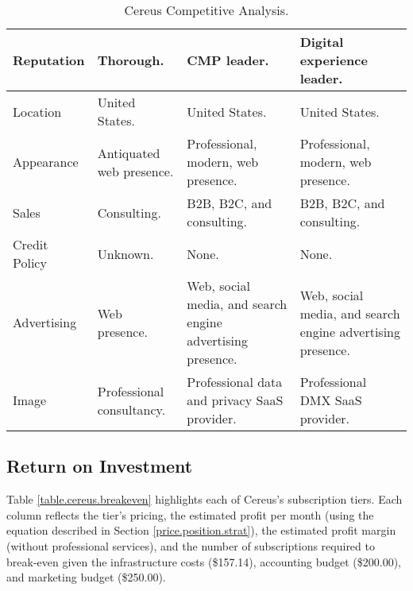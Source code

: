 \begin{sidewaystable}
\begin{tabularx}{\textwidth}{p{2.5cm} | p{6.5cm} | p{6.5cm} | p{6.5cm}}
    Reputation & Thorough. & CMP leader. & Digital experience leader. \\

    \hline

    Location & United States. & United States. & United States. \\

    \hline

    Appearance & Antiquated web presence. & Professional, modern, web presence. & Professional, modern, web presence. \\

    \hline

    Sales & Consulting. & B2B, B2C, and consulting. & B2B, B2C, and consulting. \\

    \hline

    Credit Policy & Unknown. & None. & None. \\

    \hline

    Advertising & Web presence. & Web, social media, and search engine advertising presence. & Web, social media, and search engine advertising presence. \\

    \hline

    Image & Professional consultancy. & Professional data and privacy SaaS provider. & Professional DMX SaaS provider. \\


\end{tabularx}
\caption{Cereus Competitive Analysis.}
\label{table.cereus.companal}
\end{sidewaystable}

\subsection{Return on Investment}

Table \ref{table.cereus.breakeven} highlights each of Cereus's subscription tiers. Each column reflects the tier's pricing, the estimated profit per month (using the equation described in Section \ref{price.position.strat}), the estimated profit margin (without professional services), and the number of subscriptions required to break-even given the infrastructure costs (\$157.14), accounting budget (\$200.00), and marketing budget (\$250.00).

